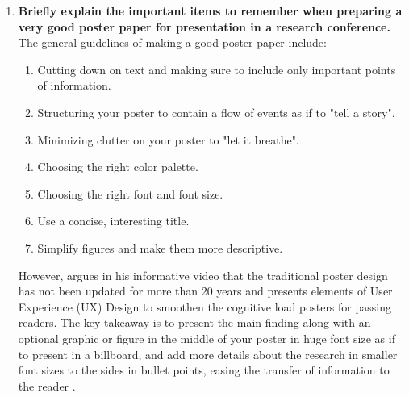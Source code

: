 \documentclass{article}
\begin{document}
\begin{enumerate}
  \item \textbf{Briefly explain the important items to remember when preparing a very good poster paper for presentation in a research conference.}
    The general guidelines of making a good poster paper include: 
    \begin{enumerate}
      \item Cutting down on text and making sure to include only important points of information.
      \item Structuring your poster to contain a flow of events as if to "tell a story".
      \item Minimizing clutter on your poster to "let it breathe".
      \item Choosing the right color palette.
      \item Choosing the right font and font size.
      \item Use a concise, interesting title.
      \item Simplify figures and make them more descriptive.
    \end{enumerate}    
    \subitem However, \cite{morrison_how_2020} argues in his informative video that the traditional poster design has not been updated for more than 20 years and presents elements of User Experience (UX) Design to smoothen the cognitive load posters for passing readers. 
    \subitem The key takeaway is to present the main finding along with an optional graphic or figure in the middle of your poster in huge font size as if to present in a billboard, and add more details about the research in smaller font sizes to the sides in bullet points, easing the transfer of information to the reader \citep{morrison_how_2020}.
 

\end{enumerate}
\end{document}
